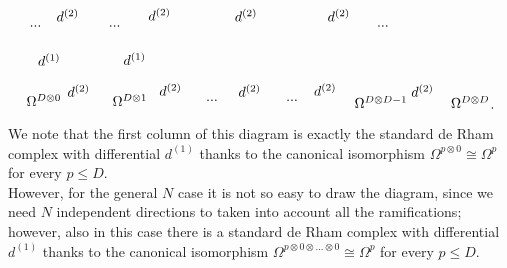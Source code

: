 \documentclass[a4paper,12pt]{article}
\begin{document}
\begin{equation}
\begin{tikzpicture}[x=0.65pt,y=0.65pt,yscale=-1,xscale=1]
\draw (435.43,368.4) node [anchor=north west][inner sep=0.75pt]    {$d^{( 2)}$};
\draw (194.81,386.4) node [anchor=north west][inner sep=0.75pt]    {$...$};
\draw (107.81,386.4) node [anchor=north west][inner sep=0.75pt]    {$...$};
\draw (489.72,386.4) node [anchor=north west][inner sep=0.75pt]    {$...$};
\draw (137.43,368.4) node [anchor=north west][inner sep=0.75pt]    {$d^{( 2)}$};
\draw (238.43,367.4) node [anchor=north west][inner sep=0.75pt]    {$d^{( 2)}$};
\draw (333.43,368.4) node [anchor=north west][inner sep=0.75pt]    {$d^{( 2)}$};
\draw (117,417.4) node [anchor=north west][inner sep=0.75pt]    {$d^{( 1)}$};
\draw (104.38,462.4) node [anchor=north west][inner sep=0.75pt]    {$\Omega ^{D\otimes 0}$};
\draw (389.81,468.4) node [anchor=north west][inner sep=0.75pt]    {$...$};
\draw (301.81,468.4) node [anchor=north west][inner sep=0.75pt]    {$...$};
\draw (420.43,450.4) node [anchor=north west][inner sep=0.75pt]    {$d^{( 2)}$};
\draw (149.43,451.4) node [anchor=north west][inner sep=0.75pt]    {$d^{( 2)}$};
\draw (250.43,450.4) node [anchor=north west][inner sep=0.75pt]    {$d^{( 2)}$};
\draw (337.43,451.4) node [anchor=north west][inner sep=0.75pt]    {$d^{( 2)}$};
\draw (199,462.4) node [anchor=north west][inner sep=0.75pt]    {$\Omega ^{D\otimes 1}$};
\draw (211,416.4) node [anchor=north west][inner sep=0.75pt]    {$d^{( 1)}$};
\draw (571,464.4) node [anchor=north west][inner sep=0.75pt]    {$\Omega ^{D\otimes D}$};
\draw (527.43,451.4) node [anchor=north west][inner sep=0.75pt]    {$d^{( 2)}$};
\draw (465,464.4) node [anchor=north west][inner sep=0.75pt]    {$\Omega ^{D\otimes D-1}$};
\end{tikzpicture}.
\label{derhamcom2multi}
\end{equation}
We note that the first column of this diagram is exactly the standard de Rham complex with differential $d^{(1)}$ thanks to the canonical isomorphism $\Omega^{p \otimes 0} \cong \Omega^p$ for every $p\leq D$.\\
However, for the general $N$ case it is not so easy to draw the diagram, since we need $N$ independent directions to taken into account all the ramifications; however, also in this case there is a standard de Rham complex with differential $d^{(1)}$ thanks to the canonical isomorphism $\Omega^{p \otimes 0 \otimes ... \otimes 0} \cong \Omega^p$ for every $p\leq D$. \\
\end{document}

